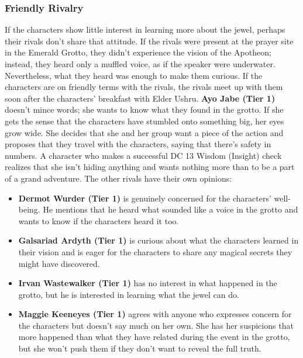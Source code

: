 \documentclass[10pt,a4,twoside,twocolumn,openany,nodeprecatedcode]{dndbook}
\begin{document}
\subsubsection{Friendly Rivalry}
If the characters show little interest in learning more about the jewel, perhaps their rivals don't share that attitude. If the rivals were present at the prayer site in the Emerald Grotto, they didn't experience the vision of the Apotheon; instead, they heard only a muffled voice, as if the speaker were underwater. Nevertheless, what they heard was enough to make them curious.
If the characters are on friendly terms with the rivals, the rivals meet up with them soon after the characters' breakfast with Elder Ushru.
\textbf{Ayo Jabe (Tier 1)} doesn't mince words; she wants to know what they found in the grotto. If she gets the sense that the characters have stumbled onto something big, her eyes grow wide. She decides that she and her group want a piece of the action and proposes that they travel with the characters, saying that there's safety in numbers. A character who makes a successful DC 13 Wisdom (Insight) check realizes that she isn't hiding anything and wants nothing more than to be a part of a grand adventure.
The other rivals have their own opinions:
\begin{itemize}

\item \textbf{Dermot Wurder (Tier 1)} is genuinely concerned for the characters' well-being. He mentions that he heard what sounded like a voice in the grotto and wants to know if the characters heard it too.
\item \textbf{Galsariad Ardyth (Tier 1)} is curious about what the characters learned in their vision and is eager for the characters to share any magical secrets they might have discovered.
\item \textbf{Irvan Wastewalker (Tier 1)} has no interest in what happened in the grotto, but he is interested in learning what the jewel can do.
\item \textbf{Maggie Keeneyes (Tier 1)} agrees with anyone who expresses concern for the characters but doesn't say much on her own. She has her suspicions that more happened than what they have related during the event in the grotto, but she won't push them if they don't want to reveal the full truth.
\end{itemize}
\end{document}
